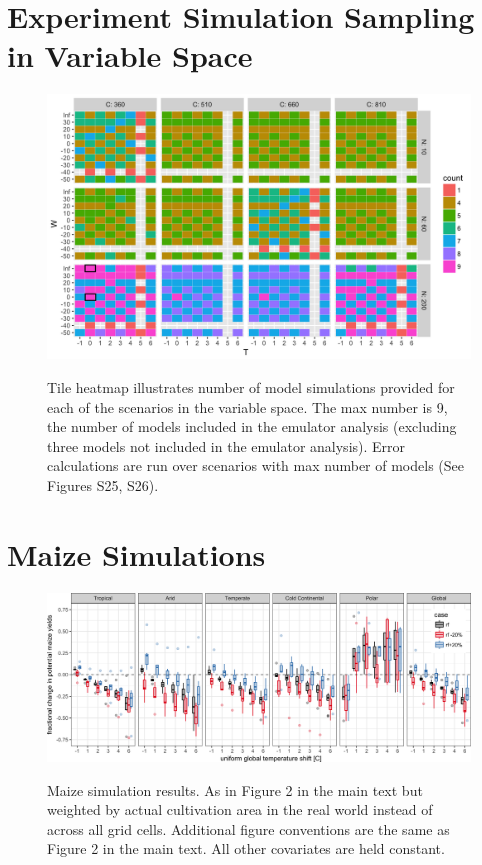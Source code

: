 \documentclass[10pt]{article}
\begin{document}
\section{Experiment Simulation Sampling in Variable Space}
\begin{figure}[h!]
\includegraphics[width=\textwidth]{s_how_many_simulations.png}\\
\caption{Tile heatmap illustrates number of model simulations provided for each of the scenarios in the variable space. The max number is 9, the number of models included in the emulator analysis (excluding three models not included in the emulator analysis). Error calculations are run over scenarios with max number of models (See Figures S25, S26).}
\label{fig:numbersims}
\end{figure}

\clearpage
\section{Maize Simulations}
\begin{figure}[h!]
\includegraphics[width=\textwidth]{s_maize_sim_CG_area_weight_rf.png}\\
\caption{Maize simulation results. As in Figure 2 in the main text but weighted by actual cultivation area in the real world instead of across all grid cells. Additional figure conventions are the same as Figure 2 in the main text. All other covariates are held constant.}
\label{fig:KGirr_currentcult}
\end{figure}
\end{document}
